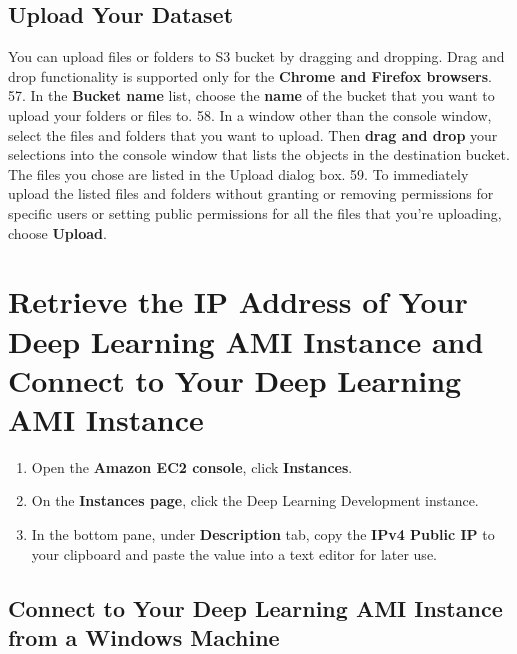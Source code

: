 \documentclass[]{book}
\providecommand{\tightlist}{%
  \setlength{\itemsep}{0pt}\setlength{\parskip}{0pt}}
\begin{document}
\hypertarget{upload-your-dataset}{%
\section{Upload Your Dataset}\label{upload-your-dataset}}

You can upload files or folders to S3 bucket by dragging and dropping. Drag and drop functionality is supported only for the \textbf{Chrome and Firefox browsers}.
57. In the \textbf{Bucket name} list, choose the \textbf{name} of the bucket that you want to upload your folders or files to.
58. In a window other than the console window, select the files and folders that you want to upload. Then \textbf{drag and drop} your selections into the console window that lists the objects in the destination bucket. The files you chose are listed in the Upload dialog box.
59. To immediately upload the listed files and folders without granting or removing permissions for specific users or setting public permissions for all the files that you're uploading, choose \textbf{Upload}.

\hypertarget{retrieve-the-ip-address-of-your-deep-learning-ami-instance-and-connect-to-your-deep-learning-ami-instance}{%
\chapter{Retrieve the IP Address of Your Deep Learning AMI Instance and Connect to Your Deep Learning AMI Instance}\label{retrieve-the-ip-address-of-your-deep-learning-ami-instance-and-connect-to-your-deep-learning-ami-instance}}

\begin{enumerate}
\def\labelenumi{\arabic{enumi}.}
\setcounter{enumi}{59}
\tightlist
\item
  Open the \textbf{Amazon EC2 console}, click \textbf{Instances}.
\item
  On the \textbf{Instances page}, click the Deep Learning Development instance.
\item
  In the bottom pane, under \textbf{Description} tab, copy the \textbf{IPv4 Public IP} to your clipboard and paste the value into a text editor for later use.
\end{enumerate}

\hypertarget{connect-to-your-deep-learning-ami-instance-from-a-windows-machine}{%
\section{Connect to Your Deep Learning AMI Instance from a Windows Machine}\label{connect-to-your-deep-learning-ami-instance-from-a-windows-machine}}
\end{document}
